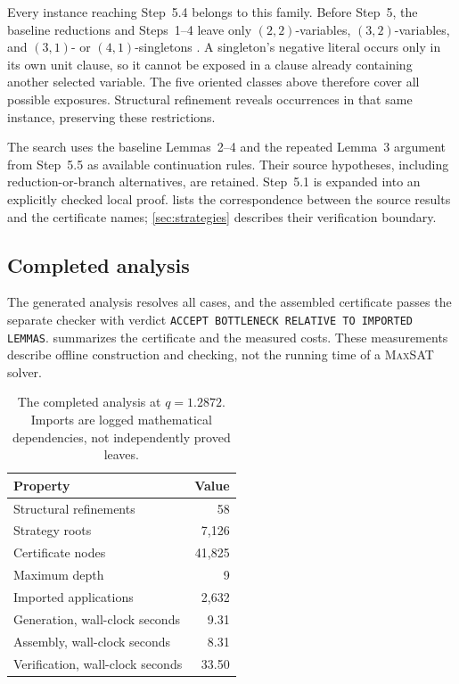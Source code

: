 \documentclass[11pt]{article}
\newcommand{\MaxSAT}{\textnormal{\textsc{MaxSAT}}}
\theoremstyle{definition}
\theoremstyle{remark}
\begin{document}
Every instance reaching Step~5.4 belongs to this family. Before Step~5,
the baseline reductions and Steps~1--4 leave only $(2,2)$-variables,
$(3,2)$-variables, and $(3,1)$- or $(4,1)$-singletons
\cite[Section~4.6]{Xiao2022}. A singleton's negative literal occurs only in
its own unit clause, so it cannot be exposed in a clause already containing
another selected variable. The five oriented classes above therefore cover
all possible exposures. Structural refinement reveals occurrences in that
same instance, preserving these restrictions.

The search uses the baseline Lemmas~2--4 and the repeated Lemma~3 argument
from Step~5.5 as available continuation rules. Their source hypotheses,
including reduction-or-branch alternatives, are retained. Step~5.1 is expanded
into an explicitly checked local proof.  lists the
correspondence between the source results and the certificate names;
\cref{sec:strategies} describes their verification boundary.

\subsection{Completed analysis}
\label{sec:artifact}

The generated analysis resolves all cases, and the assembled certificate
passes the separate checker with verdict
\texttt{ACCEPT BOTTLENECK RELATIVE TO IMPORTED LEMMAS}.
 summarizes the certificate and the measured costs. These measurements describe
offline construction and checking, not the running time of a \MaxSAT{} solver.

\begin{table}[!htbp]
\centering\small
\begin{tabular}{@{}lr@{}}
\toprule
Property & Value \\
\midrule
Structural refinements & 58 \\
Strategy roots & 7,126 \\
Certificate nodes & 41,825 \\
Maximum depth & 9 \\
Imported applications & 2,632 \\
Generation, wall-clock seconds & 9.31 \\
Assembly, wall-clock seconds & 8.31 \\
Verification, wall-clock seconds & 33.50 \\
\bottomrule
\end{tabular}
\caption{The completed analysis at $q=1.2872$.
Imports are logged mathematical dependencies, not independently proved leaves.}
\label{tab:artifact-summary}
\end{table}
\end{document}
